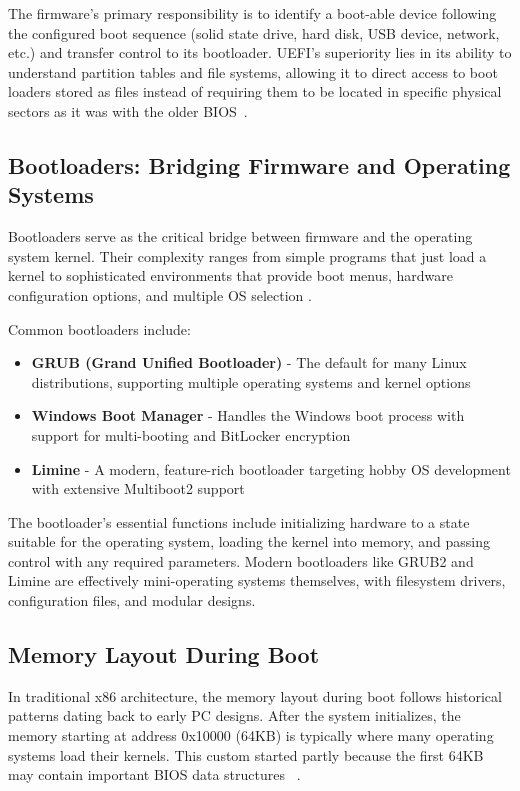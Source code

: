 \documentclass[a4paper,11pt]{article}
\begin{document}
The firmware's primary responsibility is to identify a boot-able device following the configured boot sequence (solid state drive, hard disk, USB device, network, etc.) and transfer control to its bootloader. UEFI's superiority lies in its ability to understand partition tables and file systems, allowing it to direct access to boot loaders stored as files instead of requiring them to be located in specific physical sectors as it was with the older BIOS~\cite{ms_secureboot}.

\subsection{Bootloaders: Bridging Firmware and Operating Systems}
Bootloaders serve as the critical bridge between firmware and the operating system kernel. Their complexity ranges from simple programs that just load a kernel to sophisticated environments that provide boot menus, hardware configuration options, and multiple OS selection \cite{OSDEV_Bootloader}.

Common bootloaders include:
\begin{itemize}
    \item \textbf{GRUB (Grand Unified Bootloader)} - The default for many Linux distributions, supporting multiple operating systems and kernel options \cite{GRUB}
    \item \textbf{Windows Boot Manager} - Handles the Windows boot process with support for multi-booting and BitLocker encryption \cite{Win_boot}
    \item \textbf{Limine} - A modern, feature-rich bootloader targeting hobby OS development with extensive Multiboot2 support~\cite{limine}
\end{itemize}

The bootloader's essential functions include initializing hardware to a state suitable for the operating system, loading the kernel into memory, and passing control with any required parameters. Modern bootloaders like GRUB2 and Limine are effectively mini-operating systems themselves, with filesystem drivers, configuration files, and modular designs.

\subsection{Memory Layout During Boot}
In traditional x86 architecture, the memory layout during boot follows historical patterns dating back to early PC designs. After the system initializes, the memory starting at address 0x10000 (64KB) is typically where many operating systems load their kernels. This custom started partly because the first 64KB may contain important BIOS data structures ~\cite{kernelboot}.
\end{document}
